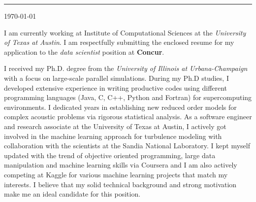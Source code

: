 \documentclass[11pt]{article}
\newcommand{\company}{\textbf{Concur}}
\newcommand{\position}{\textit{data scientist }}
\begin{document}
\thispagestyle{empty}
%
%
\begin{minipage}[t]{0.45\textwidth}
\vspace{-0.5truein}
\end{minipage} 



%
%
\vspace{0.2truein}
\rule[0.8em]{\textwidth}{1.0pt} 

\noindent
\begin{minipage}[b]{0.7\textwidth}
\vspace{-0.35truein}
\noindent
\small
\begin{tabbing}
\end{tabbing}
\vspace{0pt}
\end{minipage} \hfill
\begin{minipage}[b]{0.7\textwidth}
\vspace{0pt}
\noindent
\begin{tabbing}
\today 
\end{tabbing}
\vspace{0pt}
\end{minipage} 
%
%




I am currently working at Institute of Computational Sciences at the \emph{University of Texas at Austin}.   I am respectfully submitting the enclosed resume for my application to the \position position at \company.  

I received my Ph.D. degree from the \emph{University of Illinois at Urbana-Champaign} with a focus on large-scale parallel simulations.   During my Ph.D studies, I developed extensive experience in writing productive codes using different programming languages (Java, C, C++, Python and Fortran) for supercomputing environments.   I dedicated years in establishing new reduced order models for complex acoustic problems via rigorous statistical analysis.   As a software engineer and research associate at the University of Texas at Austin, I actively got involved in the machine learning approach for turbulence modeling with collaboration with the scientists at the Sandia National Laboratory.     I kept myself updated with the trend of objective oriented programming, large data manipulation and machine learning skills via Coursera and I am also actively competing at Kaggle for various machine learning projects that match my interests.    I believe that my solid technical background and strong motivation make me an ideal candidate for this position. 
\end{document}
